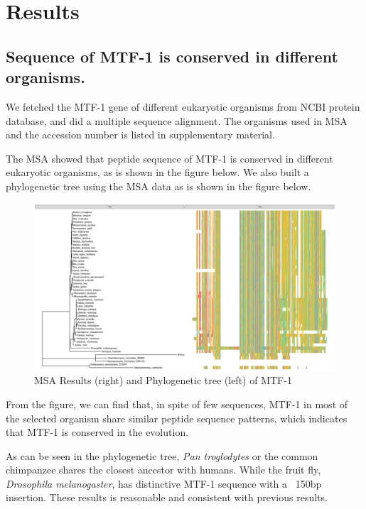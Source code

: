 \section{Results}

\subsection{Sequence of MTF-1 is conserved in different organisms.}

We fetched the MTF-1 gene of different eukaryotic organisms from NCBI protein database, and did a multiple sequence alignment. The organisms used in MSA and the accession number is listed in supplementary material.


The MSA showed that peptide sequence of MTF-1 is conserved in different eukaryotic organisms, as is shown in the figure below. We also built a phylogenetic tree using the MSA data as is shown in the figure below.

\begin{figure}[H]
    \centering
    \includegraphics[width=1\textwidth]{image/MSAT.eps}
    \caption{MSA Results (right) and Phylogenetic tree (left) of MTF-1}
    \label{MSAT}
\end{figure}

From the figure, we can find that, in spite of few sequences, MTF-1 in most of the selected organism share similar peptide sequence patterns, which indicates that MTF-1 is conserved in the evolution.

As can be seen in the phylogenetic tree, \textit{Pan troglodytes} or the common chimpanzee shares the closest ancestor with humans. While the fruit fly, \textit{Drosophila melanogaster}, has distinctive MTF-1 sequence with a ~150bp insertion. These results is reasonable and consistent with previous results.


